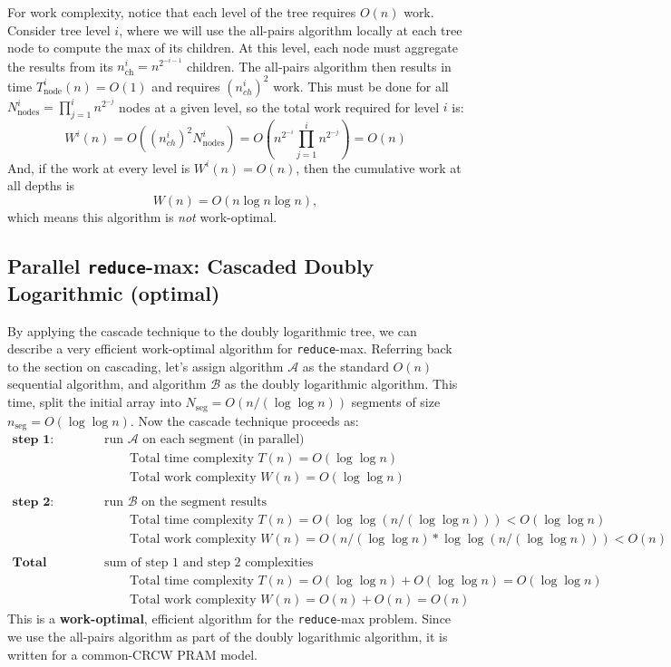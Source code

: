 \documentclass[twoside]{article}
\begin{document}
For work complexity, notice that each level of the tree requires $O(n)$ work. Consider tree level $i$, where we will use the all-pairs algorithm locally at each tree node to compute the max of its children. At this level, each node must aggregate the results from its $n_{\text{ch}}^i = n^{2^{-i-1}}$ children. The all-pairs algorithm then results in time $T_{\text{node}}^i(n) = O(1)$ and requires $(n_{ch}^{i})^2$ work. This must be done for all $N^{i}_{\text{nodes}} = \prod_{j=1}^{i}n^{2^{-j}}$ nodes at a given level, so the total work required for level $i$ is:
\[
W^{i}(n) = O((n_{ch}^{i})^{2}N^{i}_{\text{nodes}}) = O\left(n^{2^{-i}} \prod_{j=1}^{i}n^{2^{-j}}\right) = O(n)
\]
And, if the work at every level is $W^{i}(n) = O(n)$, then the cumulative work at all depths is
\[
W(n) = O(n\log n \log n),
\]
which means this algorithm is \textit{not} work-optimal.

\subsection{Parallel \texttt{reduce}-max: Cascaded Doubly Logarithmic (optimal)}
By applying the cascade technique to the doubly logarithmic tree, we can describe a very efficient work-optimal algorithm for \texttt{reduce}-max. Referring back to the section on cascading, let's assign algorithm $\mathcal{A}$ as the standard $O(n)$ sequential algorithm, and algorithm $\mathcal{B}$ as the doubly logarithmic algorithm. This time, split the initial array into $N_{\text{seg}} = O(n/(\log \log n))$ segments of size $n_{\text{seg}} = O(\log \log n)$. Now the cascade technique proceeds as:
\begin{align*}
\textbf{step 1: }& \text{run $\mathcal{A}$ on each segment (in parallel)}\\
& \qquad \text{Total time complexity } T(n) = O(\log \log n) \\
& \qquad \text{Total work complexity } W(n) = O(\log \log n)\\
&\\
\textbf{step 2: }& \text{run $\mathcal{B}$ on the segment results}\\
& \qquad \text{Total time complexity } T(n) = O(\log \log(n/(\log \log n))) < O(\log \log n) \\
& \qquad \text{Total work complexity } W(n) = O(n/(\log \log n) * \log \log(n/(\log \log n))) < O(n)\\
&\\
\textbf{Total Complexity: }& \text{sum of step 1 and step 2 complexities}\\
& \qquad \text{Total time complexity } T(n) = O(\log \log n) + O(\log \log n)  = O(\log \log n)\\
& \qquad \text{Total work complexity } W(n) = O(n) + O(n) = O(n)
\end{align*}
This is a \textbf{work-optimal}, efficient algorithm for the \texttt{reduce}-max problem. Since we use the all-pairs algorithm as part of the doubly logarithmic algorithm, it is written for a common-CRCW PRAM model.
\end{document}
